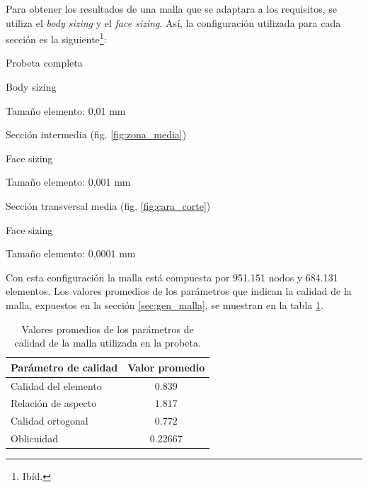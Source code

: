 Para obtener los resultados de una malla que se adaptara a los requisitos, se utiliza el \textit{body sizing} y el \textit{face sizing}. Así, la configuración utilizada para cada sección es la siguiente\footnote{Ibíd.}:
\begin{itemize*}
	\item Probeta completa
		\begin{itemize*}
			\item Body sizing
			\item Tamaño elemento: 0,01 mm
		\end{itemize*}
	\item Sección intermedia (fig. \ref{fig:zona_media})
		\begin{itemize*}
			\item Face sizing
			\item Tamaño elemento: 0,001 mm
		\end{itemize*}
	\item Sección transversal media (fig. \ref{fig:cara_corte})
		\begin{itemize*}
			\item Face sizing
			\item Tamaño elemento: 0,0001 mm
		\end{itemize*}
\end{itemize*}

\newpage

Con esta configuración la malla está compuesta por 951.151 nodos y 684.131 elementos. Los valores promedios de los parámetros que indican la calidad de la malla, expuestos en la sección \ref{sec:gen_malla}, se muestran en la tabla \ref{tab:cal_malla}.
\begin{table}[h]
\centering
\begin{tabular}{@{}lc@{}}
\toprule
Parámetro de calidad & Valor promedio \\ \midrule
Calidad del elemento & $0.839$ \\
Relación de aspecto & $1.817$ \\
Calidad ortogonal & $0.772$ \\
Oblicuidad & $0.22667$ \\ \bottomrule
\end{tabular}
\caption{Valores promedios de los parámetros de calidad de la malla utilizada en la probeta.}
\label{tab:cal_malla}
\end{table}

